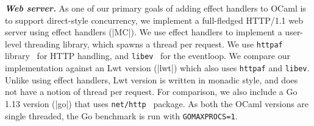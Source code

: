 \documentclass[sigplan,10pt,review,anonymous]{acmart}\settopmatter{printfolios=true,printccs=false,printacmref=false}
\begin{document}
\textbf{\textit{Web server.}} As one of our primary goals of adding effect
handlers to OCaml is to support direct-style concurrency, we implement a
full-fledged HTTP/1.1 web server using effect handlers (|MC|). We use effect
handlers to implement a user-level threading library, which spawns a thread per
request. We use \texttt{httpaf} library~\cite{httpaf} for HTTP handling, and
\texttt{libev}~\cite{libev} for the eventloop. We compare our implementation
against an Lwt version (|lwt|) which also uses \texttt{httpaf} and
\texttt{libev}. Unlike using effect handlers, Lwt version is written in monadic
style, and does not have a notion of thread per request. For comparison, we
also include a Go 1.13 version (|go|) that uses
\texttt{net/http}~\cite{nethttp} package. As both the OCaml versions are single
threaded, the Go benchmark is run with \texttt{GOMAXPROCS=1}.
\end{document}

